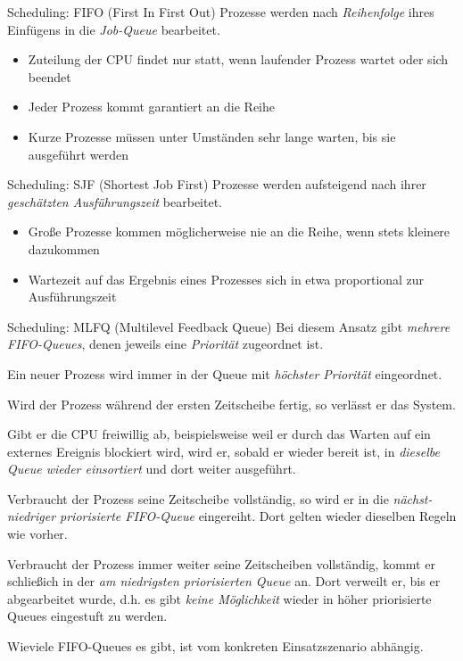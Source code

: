 \documentclass[german]{../spicker}
\begin{document}
\begin{algo}{Scheduling: FIFO (First In First Out)}
    Prozesse werden nach \emph{Reihenfolge} ihres Einfügens in die \emph{Job-Queue} bearbeitet.
    \begin{itemize}
        \item Zuteilung der CPU findet nur statt, wenn laufender Prozess wartet oder sich beendet
        \item Jeder Prozess kommt garantiert an die Reihe
        \item Kurze Prozesse müssen unter Umständen sehr lange warten, bis sie ausgeführt werden
    \end{itemize}
\end{algo}

\begin{algo}{Scheduling: SJF (Shortest Job First)}
    Prozesse werden aufsteigend nach ihrer \emph{geschätzten Ausführungszeit} bearbeitet.
    \begin{itemize}
        \item Große Prozesse kommen möglicherweise nie an die Reihe, wenn stets kleinere dazukommen
        \item Wartezeit auf das Ergebnis eines Prozesses sich in etwa proportional zur Ausführungszeit
    \end{itemize}
\end{algo}

\begin{algo}{Scheduling: MLFQ (Multilevel Feedback Queue)}
    Bei diesem Ansatz gibt \emph{mehrere FIFO-Queues}, denen jeweils
    eine \emph{Priorität} zugeordnet ist.

    Ein neuer Prozess wird immer in der Queue mit
    \emph{höchster Priorität} eingeordnet.

    Wird der Prozess während der ersten Zeitscheibe fertig,
    so verlässt er das System.

    Gibt er die CPU freiwillig ab, beispielsweise weil er
    durch das Warten auf ein externes Ereignis blockiert wird, wird er, sobald er wieder
    bereit ist, in \emph{dieselbe Queue wieder einsortiert} und dort weiter ausgeführt.

    Verbraucht der Prozess seine Zeitscheibe vollständig, so wird er in die \emph{nächst-niedriger priorisierte FIFO-Queue} eingereiht. Dort gelten wieder dieselben Regeln wie vorher.

    Verbraucht der Prozess immer weiter seine Zeitscheiben vollständig, kommt er
    schließich in der \emph{am niedrigsten priorisierten Queue} an.
    Dort verweilt er, bis er abgearbeitet wurde, d.h. es gibt \emph{keine Möglichkeit} wieder in höher priorisierte Queues
    eingestuft zu werden.

    Wieviele FIFO-Queues es gibt, ist vom konkreten Einsatzszenario abhängig.
\end{algo}
\end{document}
